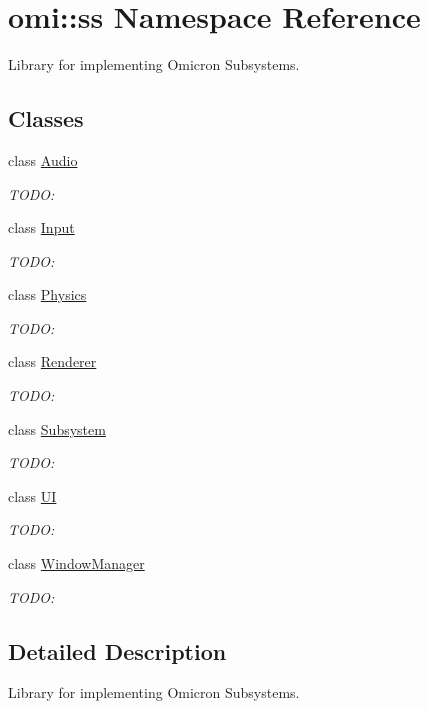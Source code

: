 \hypertarget{namespaceomi_1_1ss}{}\section{omi\+:\+:ss Namespace Reference}
\label{namespaceomi_1_1ss}


Library for implementing Omicron Subsystems.  


\subsection*{Classes}
\begin{DoxyCompactItemize}
\item 
class \hyperlink{classomi_1_1ss_1_1_audio}{Audio}
\begin{DoxyCompactList}\small\item\em T\+O\+DO\+: \end{DoxyCompactList}\item 
class \hyperlink{classomi_1_1ss_1_1_input}{Input}
\begin{DoxyCompactList}\small\item\em T\+O\+DO\+: \end{DoxyCompactList}\item 
class \hyperlink{classomi_1_1ss_1_1_physics}{Physics}
\begin{DoxyCompactList}\small\item\em T\+O\+DO\+: \end{DoxyCompactList}\item 
class \hyperlink{classomi_1_1ss_1_1_renderer}{Renderer}
\begin{DoxyCompactList}\small\item\em T\+O\+DO\+: \end{DoxyCompactList}\item 
class \hyperlink{classomi_1_1ss_1_1_subsystem}{Subsystem}
\begin{DoxyCompactList}\small\item\em T\+O\+DO\+: \end{DoxyCompactList}\item 
class \hyperlink{classomi_1_1ss_1_1_u_i}{UI}
\begin{DoxyCompactList}\small\item\em T\+O\+DO\+: \end{DoxyCompactList}\item 
class \hyperlink{classomi_1_1ss_1_1_window_manager}{Window\+Manager}
\begin{DoxyCompactList}\small\item\em T\+O\+DO\+: \end{DoxyCompactList}\end{DoxyCompactItemize}


\subsection{Detailed Description}
Library for implementing Omicron Subsystems. 